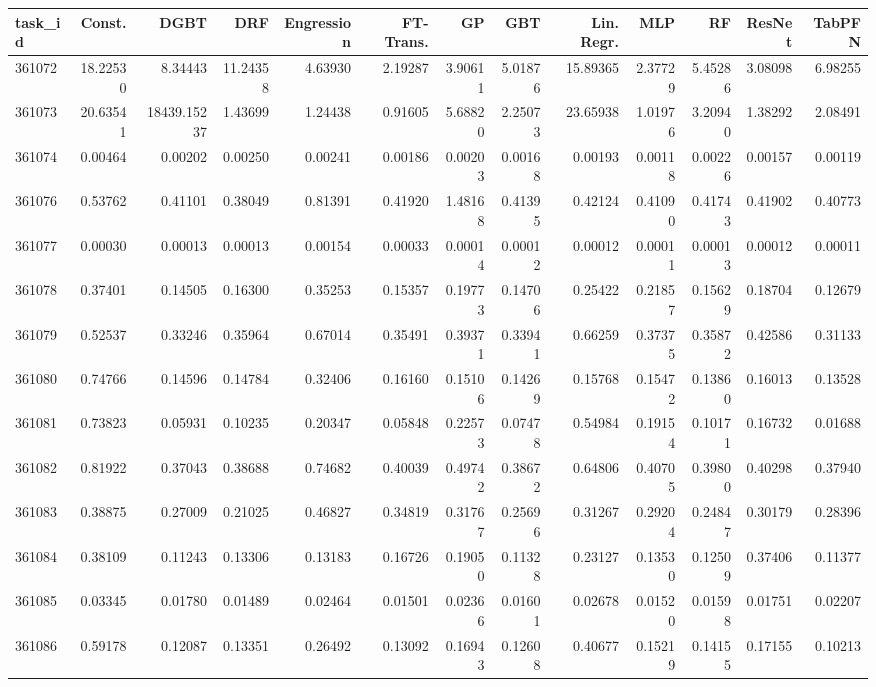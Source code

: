\begin{tabular}{lrrrrrrrrrrrr}
\toprule
task\_id & Const. & DGBT & DRF & Engression & FT-Trans. & GP & GBT & Lin. Regr. & MLP & RF & ResNet & TabPFN \\
\midrule
361072 & 18.22530 & 8.34443 & 11.24358 & 4.63930 & 2.19287 & 3.90611 & 5.01876 & 15.89365 & 2.37729 & 5.45286 & 3.08098 & 6.98255 \\
361073 & 20.63541 & 18439.15237 & 1.43699 & 1.24438 & 0.91605 & 5.68820 & 2.25073 & 23.65938 & 1.01976 & 3.20940 & 1.38292 & 2.08491 \\
361074 & 0.00464 & 0.00202 & 0.00250 & 0.00241 & 0.00186 & 0.00203 & 0.00168 & 0.00193 & 0.00118 & 0.00226 & 0.00157 & 0.00119 \\
361076 & 0.53762 & 0.41101 & 0.38049 & 0.81391 & 0.41920 & 1.48168 & 0.41395 & 0.42124 & 0.41090 & 0.41743 & 0.41902 & 0.40773 \\
361077 & 0.00030 & 0.00013 & 0.00013 & 0.00154 & 0.00033 & 0.00014 & 0.00012 & 0.00012 & 0.00011 & 0.00013 & 0.00012 & 0.00011 \\
361078 & 0.37401 & 0.14505 & 0.16300 & 0.35253 & 0.15357 & 0.19773 & 0.14706 & 0.25422 & 0.21857 & 0.15629 & 0.18704 & 0.12679 \\
361079 & 0.52537 & 0.33246 & 0.35964 & 0.67014 & 0.35491 & 0.39371 & 0.33941 & 0.66259 & 0.37375 & 0.35872 & 0.42586 & 0.31133 \\
361080 & 0.74766 & 0.14596 & 0.14784 & 0.32406 & 0.16160 & 0.15106 & 0.14269 & 0.15768 & 0.15472 & 0.13860 & 0.16013 & 0.13528 \\
361081 & 0.73823 & 0.05931 & 0.10235 & 0.20347 & 0.05848 & 0.22573 & 0.07478 & 0.54984 & 0.19154 & 0.10171 & 0.16732 & 0.01688 \\
361082 & 0.81922 & 0.37043 & 0.38688 & 0.74682 & 0.40039 & 0.49742 & 0.38672 & 0.64806 & 0.40705 & 0.39800 & 0.40298 & 0.37940 \\
361083 & 0.38875 & 0.27009 & 0.21025 & 0.46827 & 0.34819 & 0.31767 & 0.25696 & 0.31267 & 0.29204 & 0.24847 & 0.30179 & 0.28396 \\
361084 & 0.38109 & 0.11243 & 0.13306 & 0.13183 & 0.16726 & 0.19050 & 0.11328 & 0.23127 & 0.13530 & 0.12509 & 0.37406 & 0.11377 \\
361085 & 0.03345 & 0.01780 & 0.01489 & 0.02464 & 0.01501 & 0.02366 & 0.01601 & 0.02678 & 0.01520 & 0.01598 & 0.01751 & 0.02207 \\
361086 & 0.59178 & 0.12087 & 0.13351 & 0.26492 & 0.13092 & 0.16943 & 0.12608 & 0.40677 & 0.15219 & 0.14155 & 0.17155 & 0.10213 \\

\end{tabular}
